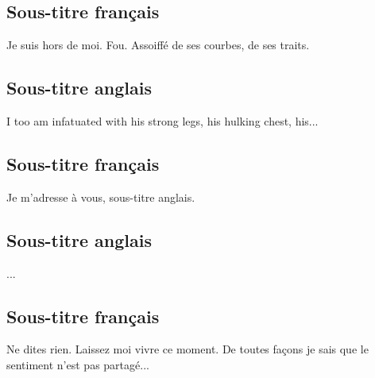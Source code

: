 \documentclass[a4paper]{article}
\begin{document}
\subsection*{Sous-titre français}
Je suis hors de moi. Fou. Assoiffé de ses courbes, de ses traits.
\subsection*{Sous-titre anglais}
I too am infatuated with his strong legs, his hulking chest, his...
\subsection*{Sous-titre français}
Je m'adresse à vous, sous-titre anglais.
\subsection*{Sous-titre anglais}
...
\subsection*{Sous-titre français}
Ne dites rien. Laissez moi vivre ce moment. De toutes façons je sais que le
sentiment n’est pas partagé...
\end{document}
